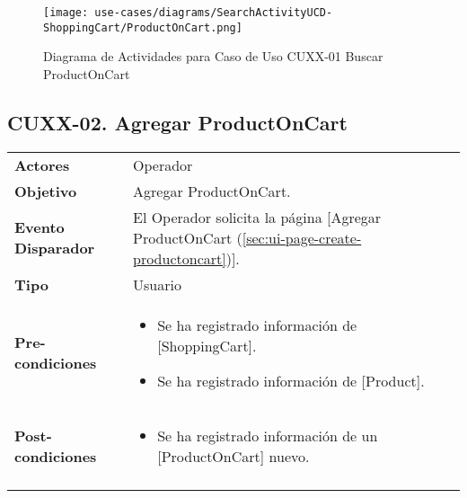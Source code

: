 	\begin{figure}[H]
		\begin{center}
			\label{tab:activity-search-ucd-entity-productoncart}
			\texttt{[image: use-cases/diagrams/SearchActivityUCD-ShoppingCart/ProductOnCart.png]}
			\caption{Diagrama de Actividades para Caso de Uso CUXX-01 Buscar ProductOnCart}
	\end{center}
	\end{figure}
	\clearpage
	\subsection{CUXX-02. Agregar ProductOnCart} \label{sec:cu-create-ProductOnCart}
	
	\begin{tabular}{ p{3.5cm} p{11.5cm} }
		\textbf{Actores} & Operador\\
		\textbf{Objetivo} & Agregar ProductOnCart.\\
		\textbf{Evento Disparador} & El Operador solicita la p\'agina [Agregar ProductOnCart (\ref{sec:ui-page-create-productoncart})].\\
		\textbf{Tipo} & Usuario\\
		\textbf{Pre-condiciones} &
			\begin{minipage}[t]{0.6\textwidth}
			\begin{itemize}[noitemsep,nolistsep]
			\setlength{\itemindent}{-.5cm}
				\item Se ha registrado informaci\'on de [ShoppingCart].
				\item Se ha registrado informaci\'on de [Product].
			\end{itemize}
			\end{minipage} \\
		\textbf{Post-condiciones} &
			\begin{minipage}[t]{0.6\textwidth}
			\begin{itemize}[noitemsep,nolistsep]
			\setlength{\itemindent}{-.5cm}
				\item Se ha registrado informaci\'on de un [ProductOnCart] nuevo.
			\end{itemize}
			\end{minipage} \\
		\\
	\end{tabular}
	
